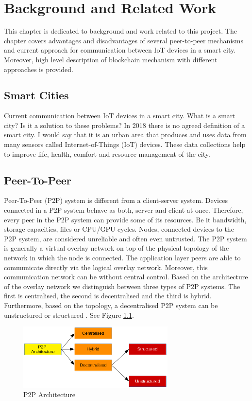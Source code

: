 \chapter{Background and Related Work\label{chap:literature-review}}
This chapter is dedicated to background and work related to this project. The chapter covers advantages and disadvantages of several peer-to-peer mechanisms and current approach for communication between IoT devices in a smart city. Moreover, high level description of blockchain mechanism with different approaches is provided.

\section{Smart Cities}
Current communication between IoT devices in a smart city.
What is a smart city? Is it a solution to these problems? In 2018 there is no agreed definition of a smart city. I would say that it is an urban area that produces and uses data from many sensors called Internet-of-Things (IoT) devices. These data collections help to improve life, health, comfort and resource management of the city.

\section{Peer-To-Peer}
\quad Peer-To-Peer (P2P) system is different from a client-server system. Devices connected in a P2P system behave as both, server and client at once. Therefore, every peer in the P2P system can provide some of its resources. Be it bandwidth, storage capacities, files or CPU/GPU cycles. Nodes, connected devices to the P2P system, are considered unreliable and often even untrusted. The P2P system is generally a virtual overlay network on top of the physical topology of the network in which the node is connected. The application layer peers are able to communicate directly via the logical overlay network. Moreover, this communication network can be without central control. Based on the architecture of the overlay network we distinguish between three types of P2P systems. The first is centralised, the second is decentralised and the third is hybrid. Furthermore, based on the topology, a decentralised P2P system can be unstructured or structured \cite{vu_peer--peer_2010}. See Figure \ref{fig:P2P-architecture}.

\begin{figure}[ht]
	\centering
	\includegraphics[width=0.7\textwidth]{images/p2p-architecture.png}
	\caption{\label{fig:P2P-architecture}P2P Architecture}
\end{figure}


